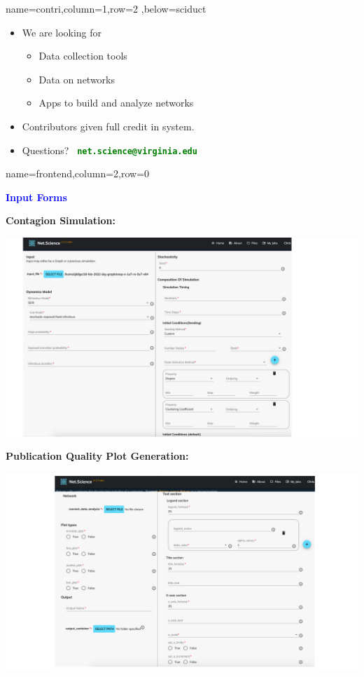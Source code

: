 \documentclass[landscape,paperwidth=70in,paperheight=46in,fontscale=0.225]{baposter} %
\begin{document}
\begin{poster}
          {name=contri,column=1,row=2 ,below=sciduct}{
\begin{itemize}[leftmargin=*,noitemsep,topsep=0pt]
\item We are looking for
\begin{itemize}
\item Data collection tools
\item Data on networks
\item Apps to build and analyze networks
\end{itemize}
\item Contributors given full credit in system.
\medskip
\item Questions?~ \textcolor{green}
        {\textbf{\texttt{net.science@virginia.edu}}}
\end{itemize}
\vspace*{0.1in}
}



          {name=frontend,column=2,row=0}{

\begin{center}
\textcolor{blue}{\large\textbf{Input Forms}}
\end{center}

\textbf{Contagion Simulation:}

\begin{center}
\includegraphics[scale=0.28]{figures/csonnet-model-seeds.pdf}
\end{center}

\textbf{Publication Quality Plot Generation:}

\begin{center}
\includegraphics[scale=0.28]{figures/plot_input.pdf}
\end{center}


}
\end{poster}
\end{document}
